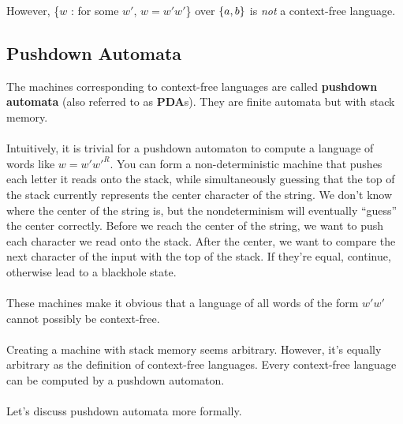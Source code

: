 \documentclass[]{article}
\DeclarePairedDelimiter{\set}{\lbrace}{\rbrace}
\theoremstyle{definition}
\begin{document}
      However, \{$w$ : for some $w'$, $w = w'w'$\} over $\set{a, b}$ is \emph{not} a context-free language.

    \subsection{Pushdown Automata}
      The machines corresponding to context-free languages are called \textbf{pushdown automata} (also referred to as \textbf{PDA}s). They are finite automata but with stack memory.
      \\ \\
      Intuitively, it is trivial for a pushdown automaton to compute a language of words like $w = w' w'^R$. You can form a non-deterministic machine that pushes each letter it reads onto the stack, while simultaneously guessing that the top of the stack currently represents the center character of the string. We don't know where the center of the string is, but the nondeterminism will eventually ``guess'' the center correctly. Before we reach the center of the string, we want to push each character we read onto the stack. After the center, we want to compare the next character of the input with the top of the stack. If they're equal, continue, otherwise lead to a blackhole state.
      \\ \\
      These machines make it obvious that a language of all words of the form $w'w'$ cannot possibly be context-free.
      \\ \\
      Creating a machine with stack memory seems arbitrary. However, it's equally arbitrary as the definition of context-free languages. Every context-free language can be computed by a pushdown automaton.
      \\ \\
      Let's discuss pushdown automata more formally.
\end{document}
